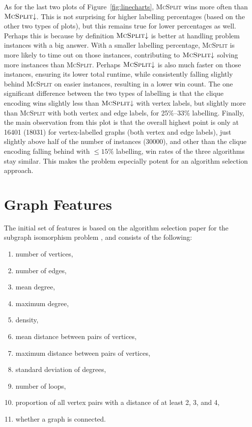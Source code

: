 \documentclass{l4proj}
\theoremstyle{definition}
\theoremstyle{remark}
\begin{document}
As for the last two plots of Figure~\ref{fig:linecharts}, \textsc{McSplit} wins
more often than $\textsc{McSplit}{\downarrow}$. This is not surprising for
higher labelling percentages (based on the other two types of plots), but this
remains true for lower percentages as well. Perhaps this is because by
definition $\textsc{McSplit}{\downarrow}$ is better at handling problem
instances with a big answer. With a smaller labelling percentage,
\textsc{McSplit} is more likely to time out on those instances, contributing to
$\textsc{McSplit}{\downarrow}$ solving more instances than \textsc{McSplit}.
Perhaps $\textsc{McSplit}{\downarrow}$ is also much faster on those instances,
ensuring its lower total runtime, while consistently falling slightly behind
\textsc{McSplit} on easier instances, resulting in a lower win count. The one
significant difference between the two types of labelling is that the clique
encoding wins slightly less than $\textsc{McSplit}{\downarrow}$ with vertex
labels, but slightly more than \textsc{McSplit} with both vertex and edge
labels, for 25\%--33\% labelling. Finally, the main observation from this plot
is that the overall highest point is only at \num{16401} (\num{18031}) for
vertex-labelled graphs (both vertex and edge labels), just slightly above half
of the number of instances (\num{30000}), and other than the clique encoding
falling behind with $\le 15\%$ labelling, win rates of the three algorithms
stay similar. This makes the problem especially potent for an algorithm
selection approach.

\section{Graph Features} \label{sec:features}

The initial set of features is based on the algorithm selection paper for the
subgraph isomorphism problem \cite{DBLP:conf/lion/KotthoffMS16}, and consists of
the following:

\begin{enumerate}
\item number of vertices,
\item number of edges,
\item mean degree,
\item maximum degree,
\item density,
\item mean distance between pairs of vertices,
\item maximum distance between pairs of vertices,
\item standard deviation of degrees,
\item number of loops,
\item proportion of all vertex pairs with a distance of at least 2, 3, and 4,
\item whether a graph is connected.
\end{enumerate}
\end{document}

